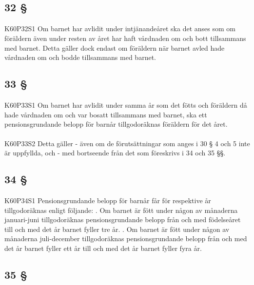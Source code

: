 \documentclass[a4paper,notitlepage,openany,10pt]{book}
\begin{document}
\subsection*{32 §}
\paragraph*{}
{\tiny K60P32S1}
Om barnet har avlidit under intjänandeåret ska det anses som om föräldern även under resten av året har haft vårdnaden om och bott tillsammans med barnet. Detta gäller dock endast om föräldern när barnet avled hade vårdnaden om och bodde tillsammans med barnet.
\subsection*{33 §}
\paragraph*{}
{\tiny K60P33S1}
Om barnet har avlidit under samma år som det fötts och föräldern då hade vårdnaden om och var bosatt tillsammans med barnet, ska ett pensionsgrundande belopp för barnår tillgodoräknas föräldern för det året.
\paragraph*{}
{\tiny K60P33S2}
Detta gäller
\newline - även om de förutsättningar som anges i 30 § 4 och 5 inte är uppfyllda, och
\newline - med bortseende från det som föreskrivs i 34 och 35 §§.
\subsection*{34 §}
\paragraph*{}
{\tiny K60P34S1}
Pensionsgrundande belopp för barnår får för respektive år tillgodoräknas enligt följande:
. Om barnet är fött under någon av månaderna januari-juni tillgodoräknas pensionsgrundande belopp från och med födelseåret till och med det år barnet fyller tre år.
. Om barnet är fött under någon av månaderna juli-december tillgodoräknas pensionsgrundande belopp från och med det år barnet fyller ett år till och med det år barnet fyller fyra år.
\subsection*{35 §}
\end{document}
